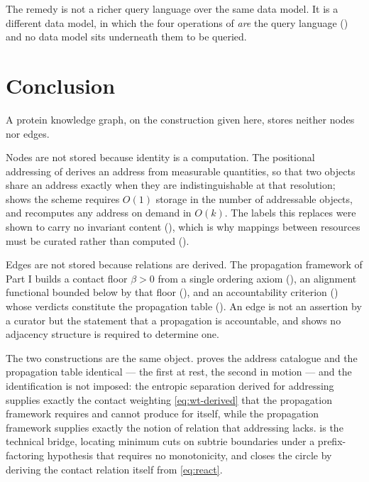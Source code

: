 \documentclass[11pt,twocolumn,a4paper]{article}
\theoremstyle{thmstyle}
\theoremstyle{definition}
\theoremstyle{remark}
\newcommand{\flo}{\beta}
\begin{document}
The remedy is not a richer query language over the same data model. It
is a different data model, in which the four operations of
 \emph{are} the query language
() and no data model sits underneath them to
be queried.

\section{Conclusion}
\label{sec:conclusion}

A protein knowledge graph, on the construction given here, stores
neither nodes nor edges.

Nodes are not stored because identity is a computation. The positional
addressing of  derives an address from measurable
quantities, so that two objects share an address exactly when they are
indistinguishable at that resolution;  shows
the scheme requires $O(1)$ storage in the number of addressable
objects, and  recomputes any address on demand in
$O(k)$. The labels this replaces were shown to carry no invariant
content (), which is why mappings between resources
must be curated rather than computed ().

Edges are not stored because relations are derived. The propagation
framework of Part I builds a contact floor $\flo > 0$ from a single
ordering axiom (), an alignment functional bounded
below by that floor (), and an accountability
criterion () whose verdicts constitute the
propagation table (). An edge is not an assertion by a
curator but the statement that a propagation is accountable, and
 shows no adjacency structure is required to
determine one.

The two constructions are the same object.  proves
the address catalogue and the propagation table identical --- the first
at rest, the second in motion --- and the identification is not
imposed: the entropic separation derived for addressing supplies
exactly the contact weighting \eqref{eq:wt-derived} that the
propagation framework requires and cannot produce for itself, while the
propagation framework supplies exactly the notion of relation that
addressing lacks.  is the technical bridge,
locating minimum cuts on subtrie boundaries under a prefix-factoring
hypothesis that requires no monotonicity, and
 closes the circle by deriving the contact relation
itself from \eqref{eq:react}.
\end{document}
